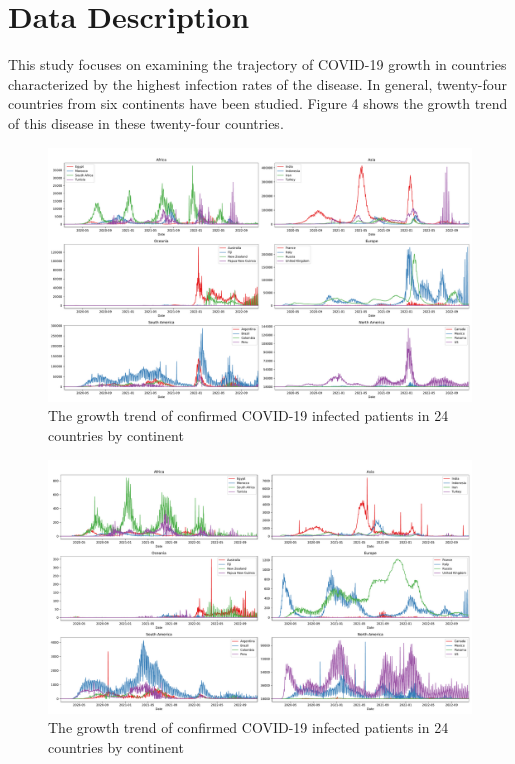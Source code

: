 \documentclass{article}
\begin{document}
\section{Data Description}

This study focuses on examining the trajectory of COVID-19 growth in countries characterized by the highest infection rates of the disease. In general, twenty-four countries from six continents have been studied. Figure 4 shows the growth trend of this disease in these twenty-four countries.
\begin{figure}[H]
	\centering
	\includegraphics[width=5.6 in]{conf.pdf}
	\caption{The growth trend of confirmed COVID-19 infected patients in 24 countries by continent}
	\label{FIG:1}
\end{figure}
\begin{figure}[H]
	\centering
	\includegraphics[width=5.6 in]{deth.pdf}
	\caption{The growth trend of confirmed COVID-19 infected patients in 24 countries by continent}
	\label{FIG:1}
\end{figure}
\end{document}
